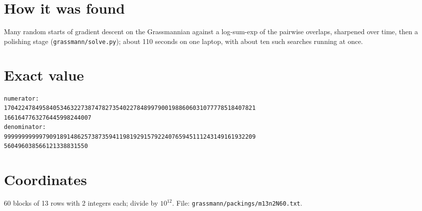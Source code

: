 \documentclass[11pt,a4paper]{article}
\begin{document}
\section{How it was found}
Many random starts of gradient descent on the Grassmannian against a log-sum-exp of the pairwise overlaps, sharpened over time, then a polishing stage (\texttt{grassmann/solve.py}); about 110 seconds on one laptop, with about ten such searches running at once.


\appendix
\section{Exact value}
{\small
\begin{verbatim}
numerator:
170422478495840534632273874782735402278489979001988606031077778518407821
1661647763276445998244007
denominator:
999999999997909189148625738735941198192915792240765945111243149161932209
560496038566121338831550
\end{verbatim}}

\section{Coordinates}
60 blocks of 13 rows with 2 integers each; divide by $10^{12}$. File: \texttt{grassmann/packings/m13n2N60.txt}.
{\tiny
\begin{multicols}{4}
\end{multicols}}
\end{document}
